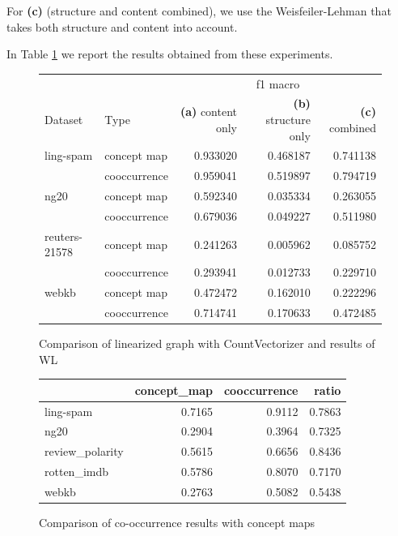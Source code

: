 For \textbf{(c)} (structure and content combined), we use the Weisfeiler-Lehman that takes both structure and content into account.

In Table \ref{fig:table-results-structure-vs-content} we report the results obtained from these experiments.

\begin{figure}[ht]
\centering
\begin{tabular}{llrrr}
          & & \multicolumn{3}{c}{f1 macro} \\
Dataset & Type & \textbf{(a)} content only & \textbf{(b)} structure only & \textbf{(c)} combined\\
\midrule
ling-spam & concept map &  0.933020 &  0.468187 &  0.741138 \\
          & cooccurrence &  0.959041 &  0.519897 &  0.794719 \\
\midrule
ng20 & concept map &  0.592340 &  0.035334 &  0.263055 \\
          & cooccurrence &  0.679036 &  0.049227 &  0.511980 \\
\midrule
reuters-21578 & concept map &  0.241263 &  0.005962 &  0.085752 \\
          & cooccurrence &  0.293941 &  0.012733 &  0.229710 \\
\midrule
webkb & concept map &  0.472472 &  0.162010 &  0.222296 \\
          & cooccurrence &  0.714741 &  0.170633 &  0.472485 \\
\bottomrule
\end{tabular}
\caption{Comparison of linearized graph with CountVectorizer and results of WL}\label{fig:table-results-structure-vs-content}
\end{figure}




\begin{figure}[ht]
\centering
\begin{tabular}{lrrr}
&  concept\_map &  cooccurrence &   ratio \\
\midrule
ling-spam       &  0.7165 &  0.9112 &  0.7863 \\
ng20            &  0.2904 &  0.3964 &  0.7325 \\
review\_polarity &  0.5615 &  0.6656 &  0.8436 \\
rotten\_imdb     &  0.5786 &  0.8070 &  0.7170 \\
webkb           &  0.2763 &  0.5082 &  0.5438 \\
\bottomrule
\end{tabular}
\caption{Comparison of co-occurrence results with concept maps}
\end{figure}

